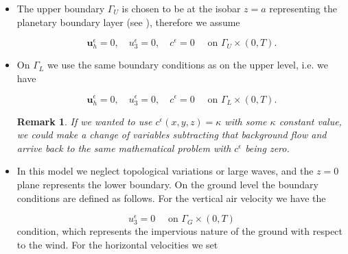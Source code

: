 \documentclass[12pt]{report}
\numberwithin{theorem}{chapter}
\numberwithin{corollary}{chapter}
\numberwithin{lemma}{chapter}
\newtheorem{remark}{Remark}
\numberwithin{remark}{chapter}
\numberwithin{definition}{chapter}
\numberwithin{prop}{chapter}
\begin{document}
\begin{itemize}
  
  \item The upper boundary $\Gamma_U$ is chosen to be at the isobar $z=a$ representing the planetary boundary layer (see \cite{arya2001introduction}), therefore we assume
    
    \begin{equation}
      \mathbf{u}^\epsilon_h = 0, \quad u^\epsilon_3 = 0, \quad c^\epsilon = 0 \quad \text{ on } \Gamma_U \times (0,T).
    \end{equation}
      
  \item On $\Gamma_L$ we use the same boundary conditions as on the upper level, i.e. we have
    
    \begin{equation}
      \mathbf{u}^\epsilon_h = 0, \quad u^\epsilon_3 = 0, \quad c^\epsilon = 0  \quad \text{ on } \Gamma_L \times (0,T).
    \end{equation}
    
    \begin{remark}
    If we wanted to use $c^\epsilon(x,y,z) = \kappa$ with some $\kappa$ constant value, we could make a change of variables subtracting that background flow and arrive back to the same mathematical problem with $c^\epsilon$ being zero.
    \end{remark}
    
  \item In this model we neglect topological variations or large waves, and the $z=0$ plane represents the lower boundary. On the ground level the boundary conditions are defined as follows. For the vertical air velocity we have the
  
    \begin{equation}
      u^\epsilon_3 = 0 \quad \text{ on } \Gamma_G \times (0,T)
    \end{equation}
condition, which represents the impervious nature of the ground with respect to the wind. For the horizontal velocities we set


\end{itemize}
\end{document}
